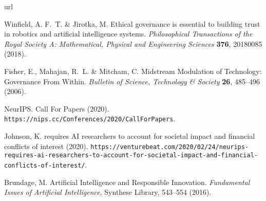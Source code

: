 \documentclass[11pt,english]{article}
\begin{document}
	\begin{thebibliography}{10}
		\expandafter\ifx\csname url\endcsname\relax
		\def\url#1{\texttt{#1}}\fi
		\providecommand{\bibinfo}[2]{#2}
		\providecommand{\eprint}[2][]{\url{#2}}
		
		\bibinfo{author}{Winfield, A. F.~T.} \& \bibinfo{author}{Jirotka, M.}
		\newblock \bibinfo{title}{Ethical governance is essential to building trust in
			robotics and artificial intelligence systems}.
		\newblock \emph{\bibinfo{journal}{Philosophical Transactions of the Royal
				Society A: Mathematical, Physical and Engineering Sciences}}
		\textbf{\bibinfo{volume}{376}}, \bibinfo{pages}{20180085}
		(\bibinfo{year}{2018}).
		
		\bibinfo{author}{Fisher, E.}, \bibinfo{author}{Mahajan, R.~L.} \&
		\bibinfo{author}{Mitcham, C.}
		\newblock \bibinfo{title}{Midstream {Modulation} of {Technology}: {Governance}
			{From} {Within}}.
		\newblock \emph{\bibinfo{journal}{Bulletin of Science, Technology \& Society}}
		\textbf{\bibinfo{volume}{26}}, \bibinfo{pages}{485--496}
		(\bibinfo{year}{2006}).
		
		\bibinfo{author}{NeurIPS}.
		\newblock \bibinfo{title}{Call {For} {Papers}} (\bibinfo{year}{2020}).
		\newblock \url{https://nips.cc/Conferences/2020/CallForPapers}.
		
		\bibinfo{author}{Johnson, K.}
		\newblock \bibinfo{title}{{NeurIPS} requires {AI} researchers to account for
			societal impact and financial conflicts of interest} (\bibinfo{year}{2020}).
		\newblock
		\url{https://venturebeat.com/2020/02/24/neurips-requires-ai-researchers-to-account-for-societal-impact-and-financial-conflicts-of-interest/}.
		
		\bibinfo{author}{Brundage, M.}
		\newblock \bibinfo{title}{Artificial {Intelligence} and {Responsible}
			{Innovation}}.
		\emph{\bibinfo{booktitle}{Fundamental {Issues} of {Artificial}
				{Intelligence}}}, Synthese {Library}, \bibinfo{pages}{543--554}
		(\bibinfo{year}{2016}).
		

\end{thebibliography}
\end{document}
